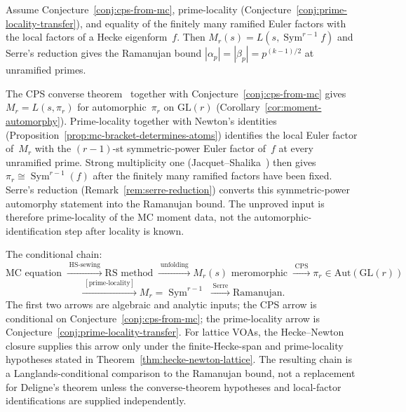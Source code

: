 \begin{conjecture}%
\label{conj:operadic-rankin-selberg-main}%
\ClaimStatusConjectured%
%
Assume Conjecture~\ref{conj:cps-from-mc}, prime-locality
\textup{(}Conjecture~\textup{\ref{conj:prime-locality-transfer}}\textup{)},
and equality of the finitely many ramified Euler factors with the
local factors of a Hecke eigenform~$f$. Then
$M_r(s)=L(s,\operatorname{Sym}^{r-1}f)$ and Serre's reduction gives
the Ramanujan bound
$|\alpha_p|=|\beta_p|=p^{(k-1)/2}$ at unramified primes.
\end{conjecture}

\begin{remark}
The CPS converse theorem~\cite{CPS1999} together with
Conjecture~\ref{conj:cps-from-mc} gives
$M_r = L(s, \pi_r)$ for automorphic~$\pi_r$ on
$\mathrm{GL}(r)$
(Corollary~\ref{cor:moment-automorphy}).
Prime-locality together with Newton's identities
(Proposition~\ref{prop:mc-bracket-determines-atoms})
identifies the local Euler factor of~$M_r$ with the
$(r-1)$-st symmetric-power Euler factor of~$f$ at every unramified
prime. Strong multiplicity one
(Jacquet--Shalika~\cite{JacquetShalika1981}) then gives
$\pi_r\cong\operatorname{Sym}^{r-1}(f)$ after the finitely many
ramified factors have been fixed. Serre's reduction
(Remark~\ref{rem:serre-reduction}) converts this symmetric-power
automorphy statement into the Ramanujan bound. The unproved input is
therefore prime-locality of the MC moment data, not the
automorphic-identification step after locality is known.
\end{remark}

\begin{remark}%
\label{rem:complete-chain}%
%
The conditional chain:
\[
\text{MC equation}
\;\xrightarrow{\;\text{HS-sewing}\;}
\text{RS method}
\;\xrightarrow{\;\text{unfolding}\;}
M_r(s) \text{ meromorphic}
\;\xrightarrow{\;\text{CPS}\;}
\pi_r \in \mathrm{Aut}(\mathrm{GL}(r))
\]
\[
\xrightarrow{\;[\text{prime-locality}]\;}
M_r = \operatorname{Sym}^{r-1}
\;\xrightarrow{\;\text{Serre}\;}
\text{Ramanujan.}
\]
The first two arrows are algebraic and analytic inputs; the CPS arrow
is conditional on Conjecture~\ref{conj:cps-from-mc}; the
prime-locality arrow is Conjecture~\ref{conj:prime-locality-transfer}.
For lattice VOAs, the Hecke--Newton closure supplies this arrow only
under the finite-Hecke-span and prime-locality hypotheses stated in
Theorem~\ref{thm:hecke-newton-lattice}. The resulting chain is a
Langlands-conditional comparison to the Ramanujan bound, not a
replacement for Deligne's theorem unless the converse-theorem
hypotheses and local-factor identifications are supplied independently.
\end{remark}

